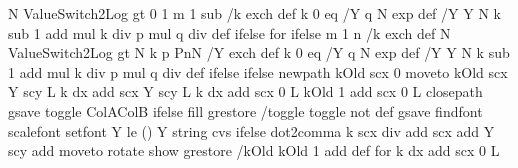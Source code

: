 {{    N ValueSwitch2Log gt 
      { } 
      { 0 1 m 1 sub 
        {%
          /k exch def       %
          k 0 eq
            { /Y q N exp def }
            { /Y Y N k sub 1 add mul k div p mul q div def }
          ifelse
        } for
      } ifelse
      m 1 n {%
        /k exch def       %
        N ValueSwitch2Log gt 
          { N k p PnN /Y exch def }
          { k 0 eq
            { /Y q N exp def }
            { /Y Y N k sub 1 add mul k div p mul q div def }
            ifelse 
          } 
          ifelse %
      \ifx\psk@fillstylename\pst@alternateColors
        newpath
        kOld scx 0 moveto
      \fi
      kOld scx Y scy L k dx add scx Y scy L
      \ifPst@markZeros k dx add scx 0 L kOld 1 add scx 0 L \fi
      \ifx\psk@fillstylename\pst@alternateColors
        closepath
        gsave toggle {ColA}{ColB} ifelse \tx@setTransparency fill grestore
        /toggle toggle not def
      \fi
      \ifPst@printValue
        gsave \psk@PSfont\space findfont \psk@fontscale scalefont setfont \pst@usecolor\psk@LabelColor %
        Y \psFunc@PrintVLimit le { () } { Y \psk@valuewidth\space string cvs } ifelse
        \ifPst@comma dot2comma \fi
        k scx  div add \psFunc@xlabelsep scx add
        Y scy \pst@number\pslabelsep add moveto
        \psFunc@langle rotate show grestore
      \fi
      /kOld kOld 1 add def
    } for
    \ifPst@markZeros\else k dx add scx 0 L \fi %
  }%
  \end@OpenObj
}%
%
%
\def\psBinomialN{\pst@object{psBinomialN}}%
